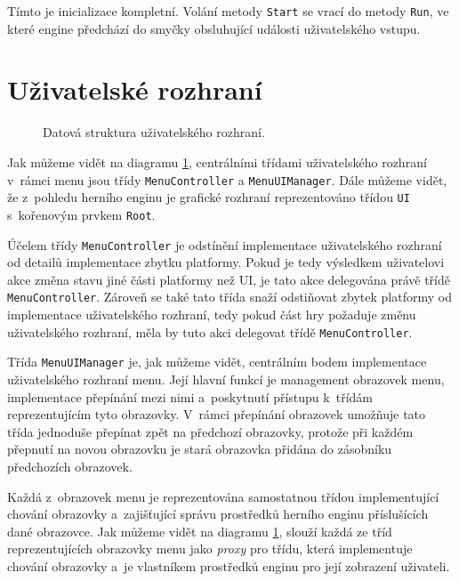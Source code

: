 Tímto je inicializace kompletní. Volání metody \texttt{Start} se vrací do metody \texttt{Run}, ve které engine předchází do smyčky obsluhující události uživatelského vstupu.

\section{Uživatelské rozhraní}
\label{sec:ui}

\begin{figure}[h]
	\centering
	\fontsize{8pt}{11pt}\selectfont
	\def\svgwidth{\textwidth}
	
	\caption{Datová struktura uživatelského rozhraní.}
	\label{fig:uireferences}
\end{figure}

Jak můžeme vidět na diagramu \ref{fig:uireferences}, centrálními třídami uživatelského rozhraní v~rámci menu jsou třídy \texttt{MenuController} a \texttt{MenuUIManager}. Dále můžeme vidět, že z~pohledu herního enginu je grafické rozhraní reprezentováno třídou \texttt{UI} s~kořenovým prvkem \texttt{Root}.

Účelem třídy \texttt{MenuController} je odstínění implementace uživatelského rozhraní od detailů implementace zbytku platformy. Pokud je tedy výsledkem uživatelovi akce změna stavu jiné části platformy než UI, je tato akce delegována právě třídě \texttt{MenuController}. Zároveň se také tato třída snaží odstiňovat zbytek platformy od implementace uživatelského rozhraní, tedy pokud část hry požaduje změnu uživatelského rozhraní, měla by tuto akci delegovat třídě \texttt{MenuController}.

Třída \texttt{MenuUIManager} je, jak můžeme vidět, centrálním bodem implementace uživatelského rozhraní menu. Její hlavní funkcí je management obrazovek menu, implementace přepínání mezi nimi a~poskytnutí přístupu k~třídám reprezentujícím tyto obrazovky. V~rámci přepínání obrazovek umožňuje tato třída jednoduše přepínat zpět na předchozí obrazovky, protože při každém přepnutí na novou obrazovku je stará obrazovka přidána do zásobníku předchozích obrazovek.

Každá z~obrazovek menu je reprezentována samostatnou třídou implementující chování obrazovky a~zajišťující správu prostředků herního enginu příslušících dané obrazovce. Jak můžeme vidět na diagramu \ref{fig:uireferences}, slouží každá ze tříd reprezentujících obrazovky menu jako \textit{proxy} pro třídu, která implementuje chování obrazovky a~je vlastníkem prostředků enginu pro její zobrazení uživateli. 

